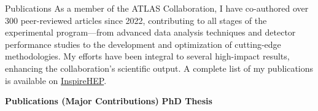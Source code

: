 \documentclass[11pt]{resume} %
\begin{document}
    \begin{rSection}{Publications}
        As a member of the ATLAS Collaboration, I have co-authored over 300 peer-reviewed articles since 2022, 
        contributing to all stages of the experimental program—from advanced data analysis techniques and detector 
        performance studies to the development and optimization of cutting-edge methodologies. 
        My efforts have been integral to several high-impact results, enhancing the collaboration's 
        scientific output. A complete list of my publications is available on \href{https://inspirehep.net/authors/2164455}{InspireHEP}.

        \textbf{Publications (Major Contributions)}
            \printbibliography[heading=none,type=article,title={ATLAS Publications (Major Contributions)}]
        \textbf{PhD Thesis}
            \printbibliography[heading=none,type=thesis,title={PhD Thesis}]
        
    \end{rSection}
\end{document}

